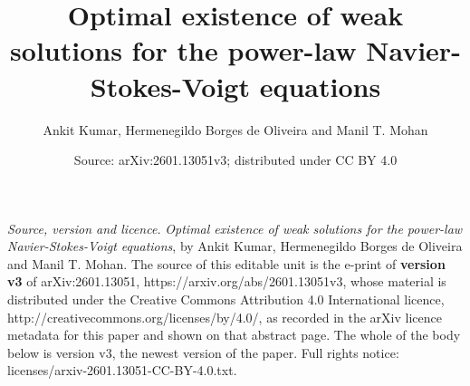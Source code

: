 \documentclass[10pt,a4paper]{amsart}
\theoremstyle{definition}
\begin{document}
\title{Optimal existence of weak solutions for the power-law Navier-Stokes-Voigt equations}
\author{Ankit Kumar, Hermenegildo Borges de Oliveira and Manil T. Mohan}
\date{Source: arXiv:2601.13051v3; distributed under CC BY 4.0}
\maketitle
\noindent\emph{Source, version and licence.} \emph{Optimal existence of weak solutions for the power-law Navier-Stokes-Voigt equations}, by Ankit Kumar, Hermenegildo Borges de Oliveira and Manil T. Mohan. The source of this editable unit is the e-print of \textbf{version v3} of arXiv:2601.13051, https://arxiv.org/abs/2601.13051v3, whose material is distributed under the Creative Commons Attribution 4.0 International licence, http://creativecommons.org/licenses/by/4.0/, as recorded in the arXiv licence metadata for this paper and shown on that abstract page. The whole of the body below is version v3, the newest version of the paper. Full rights notice: licenses/arxiv-2601.13051-CC-BY-4.0.txt.\par\smallskip
\end{document}
